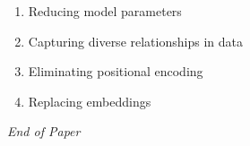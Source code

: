 \documentclass[12pt]{article}
\begin{document}
\begin{enumerate}[label=Q\arabic*.]
\begin{enumerate}[label=(\Alph*)]
    \item Reducing model parameters
    \item Capturing diverse relationships in data
    \item Eliminating positional encoding
    \item Replacing embeddings
\end{enumerate}
\end{enumerate}

\vfill
\noindent\textit{End of Paper}
\end{document}
